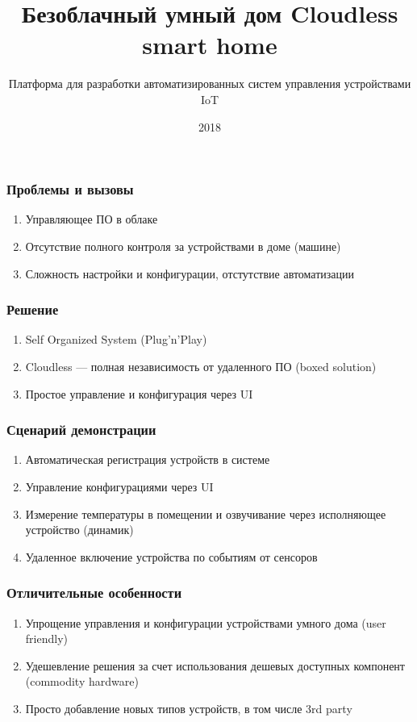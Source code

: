 \documentclass[14pt]{beamer}
\title{\textbf{Безоблачный умный дом} Cloudless smart home}
\author{Платформа для разработки автоматизированных 
  систем управления устройствами IoT
}
\date{2018}
\begin{document}
\maketitle

\begin{frame}
  \frametitle{Проблемы и вызовы}
  \begin{enumerate}
    \item Управляющее ПО в облаке
    \item Отсутствие полного контроля за устройствами в доме (машине)
    \item Сложность настройки и конфигурации, отстутствие автоматизации
  \end{enumerate}
\end{frame}

\begin{frame}
  \frametitle{Решение}
  \begin{enumerate}
    \item Self Organized System (Plug'n'Play)
    \item Cloudless --- полная независимость от удаленного ПО (boxed solution)
    \item Простое управление и конфигурация через UI
  \end{enumerate}
\end{frame}

\begin{frame}
  \frametitle{Сценарий демонстрации}
  \begin{enumerate}
    \item Автоматическая регистрация устройств в системе
    \item Управление конфигурациями через UI
    \item Измерение температуры в помещении и озвучивание через
      исполняющее устройство (динамик)
    \item Удаленное включение устройства по событиям от сенсоров
  \end{enumerate}
\end{frame}

\begin{frame}
  \frametitle{Отличительные особенности}
  \begin{enumerate}
    \item Упрощение управления и конфигурации устройствами умного
      дома (user friendly)
    \item Удешевление решения за счет использования дешевых
      доступных компонент (commodity hardware)
    \item Просто добавление новых типов устройств, в том числе 
      3rd party
  \end{enumerate}
\end{frame}
\end{document}
